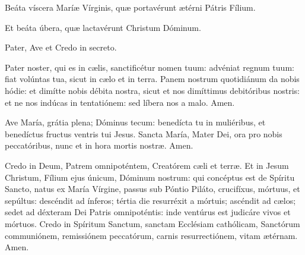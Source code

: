 \documentclass[12pt,a5paper,openany]{memoir}
\begin{document}
\switchcolumn*


\versicle Beáta víscera Maríæ Vírginis, quæ portavérunt ætérni Pátris Fílium.

\response Et beáta úbera, quæ lactavérunt Christum Dóminum.

\switchcolumn



\switchcolumn*
{}

Pater, Ave et Credo in secreto.

\switchcolumn


\switchcolumn*

Pater noster, qui es in cælis, sanctificétur nomen tuum: advéniat regnum tuum: fiat volúntas tua, sicut in cælo et in terra. Panem nostrum quotidiánum da nobis hódie: et dimítte nobis débita nostra, sicut et nos dimíttimus debitóribus nostris: et ne nos indúcas in tentatiónem: sed líbera nos a malo. Amen.

\switchcolumn


\switchcolumn*

Ave María, grátia plena; Dóminus tecum: benedícta tu in muliéribus, et benedíctus fructus ventris tui Jesus. Sancta María, Mater Dei, ora pro nobis peccatóribus, nunc et in hora mortis nostræ. Amen.


\switchcolumn


\switchcolumn*

Credo in Deum, Patrem omnipoténtem, Creatórem cæli et terræ. Et in Jesum Christum, Fílium ejus únicum, Dóminum nostrum: qui concéptus est de Spíritu Sancto, natus ex María Vírgine, passus sub Póntio Piláto, crucifíxus, mórtuus, et sepúltus: descéndit ad ínferos; tértia die resurréxit a mórtuis; ascéndit ad cælos; sedet ad déxteram Dei Patris omnipoténtis: inde ventúrus est judicáre vivos et mórtuos. Credo in Spíritum Sanctum, sanctam Ecclésiam cathólicam, Sanctórum communiónem, remissiónem peccatórum, carnis resurrectiónem, vitam ætérnam. Amen.
\switchcolumn
\end{document}
